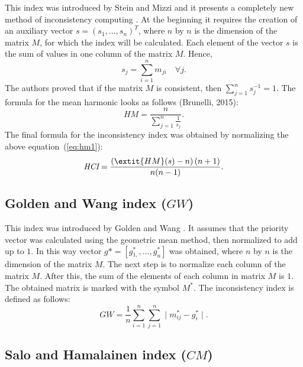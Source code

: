 This index was introduced by Stein and Mizzi and it presents a completely new method of inconsistency computing \cite{STEIN2007}. At the beginning it requires the creation of an auxiliary vector $s=(s_{1},...,s_{n})^{T}$, where $n$ by $n$ is the dimension of the matrix $M$, for which the index will be calculated. Each element of the vector $s$ is the sum of values in one column of the matrix $M$. Hence, 
	\begin{equation} 
		s_{j}=\sum_{i=1}^{n}m_{ji}\,\,\,\,\,\,\forall j.
	 \end{equation}
 The authors proved that if the matrix $M$ is consistent, then $\sum_{j=1}^{n}s_{j}^{-1}=1$. The formula for the mean harmonic looks as follows (Brunelli, 2015):
	 \begin{equation} 
		\label{eq:hm1}
		\textit{HM}=\frac{n}{\sum_{j=1}^{n}\frac{1}{s_{j}}}.
	 \end{equation}
 The final formula for the inconsistency index was obtained by normalizing the above equation~(\ref{eq:hm1}):
 	\begin{equation} 
		\textit{HCI}=\frac{\left(\extit{HM}(s)-n\right)\left(n+1\right)}{n(n-1)}.
	 \end{equation}
 

\subsection{Golden and Wang index ($\textit{GW}$)}

This index was introduced by Golden and Wang \cite{Golden1989}. It assumes that the priority vector was calculated using the geometric mean method, then normalized to add up to $1$. In this way vector $g*=[g{}_{1,}^{*},...,g_{n}^{*}]$ was obtained, where $n$ by $n$ is the dimension of the matrix $M$. The next step is to normalize each column of the matrix $M$. After this, the sum of the elements of each column in matrix $M$ is $1$. The obtained matrix is marked with the symbol $M^{*}$. The inconsistency index is defined as follows:
	\begin{equation} 
		\textit{GW}=\frac{1}{n}\sum_{i=1}^{n}\sum_{j=1}^{n}\mid m_{ij}^{*}-g_{i}^{*}\mid.
	 \end{equation}
 

\subsection{Salo and Hamalainen index ($\textit{CM}$)}

